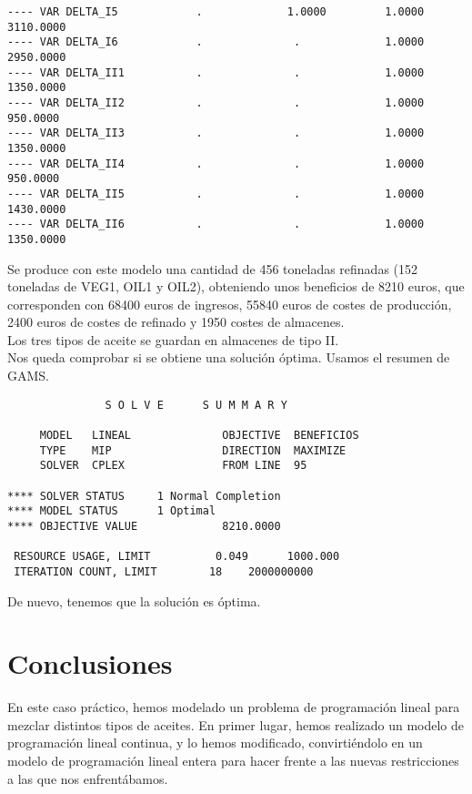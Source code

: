 \documentclass[12pt,a4paper,twoside,openright,titlepage,final]{article}
\begin{document}
\begin{verbatim}
---- VAR DELTA_I5            .             1.0000         1.0000      3110.0000      
---- VAR DELTA_I6            .              .             1.0000      2950.0000
---- VAR DELTA_II1           .              .             1.0000      1350.0000      
---- VAR DELTA_II2           .              .             1.0000       950.0000      
---- VAR DELTA_II3           .              .             1.0000      1350.0000      
---- VAR DELTA_II4           .              .             1.0000       950.0000      
---- VAR DELTA_II5           .              .             1.0000      1430.0000      
---- VAR DELTA_II6           .              .             1.0000      1350.0000      

\end{verbatim}

Se produce con este modelo una cantidad de 456 toneladas refinadas (152 toneladas de VEG1, OIL1 y OIL2), obteniendo unos beneficios de 8210 euros, que corresponden con 68400 euros de ingresos, 55840 euros de costes de producción, 2400 euros de costes de refinado y 1950 costes de almacenes.\\

Los tres tipos de aceite se guardan en almacenes de tipo II.\\

Nos queda comprobar si se obtiene una solución óptima. Usamos el resumen de GAMS.

\begin{verbatim}
               S O L V E      S U M M A R Y

     MODEL   LINEAL              OBJECTIVE  BENEFICIOS
     TYPE    MIP                 DIRECTION  MAXIMIZE
     SOLVER  CPLEX               FROM LINE  95

**** SOLVER STATUS     1 Normal Completion         
**** MODEL STATUS      1 Optimal                   
**** OBJECTIVE VALUE             8210.0000

 RESOURCE USAGE, LIMIT          0.049      1000.000
 ITERATION COUNT, LIMIT        18    2000000000
\end{verbatim}

De nuevo, tenemos que la solución es óptima.

\section{Conclusiones}

En este caso práctico, hemos modelado un problema de programación lineal para mezclar distintos tipos de aceites. En primer lugar, hemos realizado un modelo de programación lineal continua, y lo hemos modificado, convirtiéndolo en un modelo de programación lineal entera para hacer frente a las nuevas restricciones a las que nos enfrentábamos.\\
\end{document}
